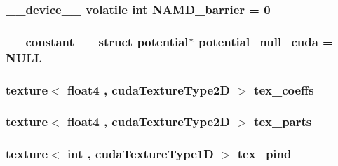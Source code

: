 \hypertarget{runner__cuda_8cu_af9bd293eee8e022bec689d20692b967b}{
\subsubsection[{N\-A\-M\-D\-\_\-barrier}]{\setlength{\rightskip}{0pt plus 5cm}\-\_\-\-\_\-device\-\_\-\-\_\- volatile int N\-A\-M\-D\-\_\-barrier = 0}}\label{runner__cuda_8cu_af9bd293eee8e022bec689d20692b967b}
\hypertarget{runner__cuda_8cu_a4f0b849536c8706d83970da4de5dbba5}{
\subsubsection[{potential\-\_\-null\-\_\-cuda}]{\setlength{\rightskip}{0pt plus 5cm}\-\_\-\-\_\-constant\-\_\-\-\_\- struct {\bf potential}$\ast$ potential\-\_\-null\-\_\-cuda = N\-U\-L\-L}}\label{runner__cuda_8cu_a4f0b849536c8706d83970da4de5dbba5}
\hypertarget{runner__cuda_8cu_ae2d751252687593dfcce55a03598e200}{
\subsubsection[{tex\-\_\-coeffs}]{\setlength{\rightskip}{0pt plus 5cm}texture$<$ float4 , cuda\-Texture\-Type2\-D $>$ tex\-\_\-coeffs}}\label{runner__cuda_8cu_ae2d751252687593dfcce55a03598e200}
\hypertarget{runner__cuda_8cu_a124f5902fd9b618e8cc624e58734bae4}{
\subsubsection[{tex\-\_\-parts}]{\setlength{\rightskip}{0pt plus 5cm}texture$<$ float4 , cuda\-Texture\-Type2\-D $>$ tex\-\_\-parts}}\label{runner__cuda_8cu_a124f5902fd9b618e8cc624e58734bae4}
\hypertarget{runner__cuda_8cu_a00bdff2f6bb8d60e1c281a270157e997}{
\subsubsection[{tex\-\_\-pind}]{\setlength{\rightskip}{0pt plus 5cm}texture$<$ int , cuda\-Texture\-Type1\-D $>$ tex\-\_\-pind}}\label{runner__cuda_8cu_a00bdff2f6bb8d60e1c281a270157e997}
